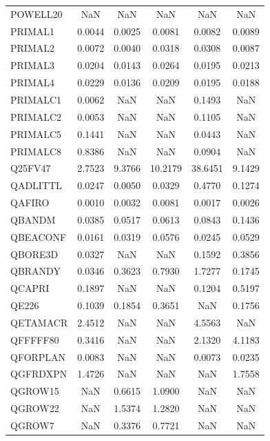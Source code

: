 \begin{longtable}{lccccc}
POWELL20 &      NaN &      NaN &      NaN &      NaN &      NaN \\
PRIMAL1  &   0.0044 &   0.0025 &   0.0081 &   0.0082 &   0.0089 \\
PRIMAL2  &   0.0072 &   0.0040 &   0.0318 &   0.0308 &   0.0087 \\
PRIMAL3  &   0.0204 &   0.0143 &   0.0264 &   0.0195 &   0.0213 \\
PRIMAL4  &   0.0229 &   0.0136 &   0.0209 &   0.0195 &   0.0188 \\
PRIMALC1 &   0.0062 &      NaN &      NaN &   0.1493 &      NaN \\
PRIMALC2 &   0.0053 &      NaN &      NaN &   0.1105 &      NaN \\
PRIMALC5 &   0.1441 &      NaN &      NaN &   0.0443 &      NaN \\
PRIMALC8 &   0.8386 &      NaN &      NaN &   0.0904 &      NaN \\
Q25FV47  &   2.7523 &   9.3766 &  10.2179 &  38.6451 &   9.1429 \\
QADLITTL &   0.0247 &   0.0050 &   0.0329 &   0.4770 &   0.1274 \\
QAFIRO   &   0.0010 &   0.0032 &   0.0081 &   0.0017 &   0.0026 \\
QBANDM   &   0.0385 &   0.0517 &   0.0613 &   0.0843 &   0.1436 \\
QBEACONF &   0.0161 &   0.0319 &   0.0576 &   0.0245 &   0.0529 \\
QBORE3D  &   0.0327 &      NaN &      NaN &   0.1592 &   0.3856 \\
QBRANDY  &   0.0346 &   0.3623 &   0.7930 &   1.7277 &   0.1745 \\
QCAPRI   &   0.1897 &      NaN &      NaN &   0.1204 &   0.5197 \\
QE226    &   0.1039 &   0.1854 &   0.3651 &      NaN &   0.1756 \\
QETAMACR &   2.4512 &      NaN &      NaN &   4.5563 &      NaN \\
QFFFFF80 &   0.3416 &      NaN &      NaN &   2.1320 &   4.1183 \\
QFORPLAN &   0.0083 &      NaN &      NaN &   0.0073 &   0.0235 \\
QGFRDXPN &   1.4726 &      NaN &      NaN &      NaN &   1.7558 \\
QGROW15  &      NaN &   0.6615 &   1.0900 &      NaN &      NaN \\
QGROW22  &      NaN &   1.5374 &   1.2820 &      NaN &      NaN \\
QGROW7   &      NaN &   0.3376 &   0.7721 &      NaN &      NaN \\

\end{longtable}
